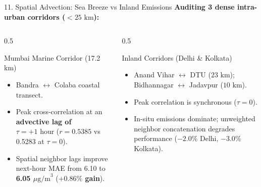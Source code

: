 \documentclass[aspectratio=169]{beamer}
\begin{document}
\begin{frame}{11. Spatial Advection: Sea Breeze vs Inland Emissions}
  \textbf{Auditing 3 dense intra-urban corridors ($<25\text{ km}$):}
  \begin{columns}
    \begin{column}{0.5\textwidth}
      \begin{block}{Mumbai Marine Corridor (17.2 km)}
        \begin{itemize}
          \item Bandra $\leftrightarrow$ Colaba coastal transect.
          \item Peak cross-correlation at an \textbf{advective lag of $\tau = +1\text{ hour}$} ($r = 0.5385$ vs 0.5283 at $\tau=0$).
          \item Spatial neighbor lags improve next-hour MAE from 6.10 to \textbf{6.05 $\mu\text{g/m}^3$} (\textbf{$+0.86\%$ gain}).
        \end{itemize}
      \end{block}
    \end{column}
    \begin{column}{0.5\textwidth}
      \begin{block}{Inland Corridors (Delhi \& Kolkata)}
        \begin{itemize}
          \item Anand Vihar $\leftrightarrow$ DTU ($23\text{ km}$); Bidhannagar $\leftrightarrow$ Jadavpur ($10\text{ km}$).
          \item Peak correlation is synchronous ($\tau = 0$).
          \item In-situ emissions dominate; unweighted neighbor concatenation degrades performance ($-2.0\%$ Delhi, $-3.0\%$ Kolkata).
        \end{itemize}
      \end{block}
    \end{column}
  \end{columns}
\end{frame}
\end{document}
